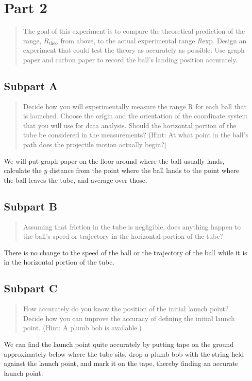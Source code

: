 \documentclass[8pt]{extarticle}
\newcommand{\plain}[1]{\textrm{#1}}
\begin{document}
{\section*{Part 2}
\begin{quote}
	The goal of this experiment is to compare the theoretical prediction of the range, $ R_{\plain{theo}} $ from above, to the actual experimental range $ R{\plain{exp}} $.  Design an experiment that could test the theory as accurately as possible.  Use graph paper and carbon paper to record the ball’s landing position accurately. 
\end{quote}
\subsection*{Subpart A}
\begin{quote}
	Decide how you will experimentally measure the range R for each ball that is launched.  Choose the origin and the orientation of the coordinate system that you will use for data analysis.  Should the horizontal portion of the tube be considered in the measurements?  (Hint: At what point in the ball’s path does the projectile motion actually begin?)
\end{quote}
We will put graph paper on the floor around where the ball usually lands, calculate the $y$ distance from the point where the ball lands to the point where the ball leaves the tube, and average over those.
\subsection*{Subpart B}
\begin{quote}
	Assuming that friction in the tube is negligible, does anything happen to the ball’s speed or trajectory in the horizontal portion of the tube?
\end{quote}
There is no change to the speed of the ball or the trajectory of the ball while it is in the horizontal portion of the tube.
\subsection*{Subpart C}
\begin{quote}
	How accurately do you know the position of the initial launch point?  Decide how you can improve the accuracy of defining the initial launch point.  (Hint: A plumb bob is available.)
\end{quote}
We can find the launch point quite accurately by putting tape on the ground approximately below where the tube sits, drop a plumb bob with the string held against the launch point, and mark it on the tape, thereby finding an accurate launch point.
}
\end{document}
